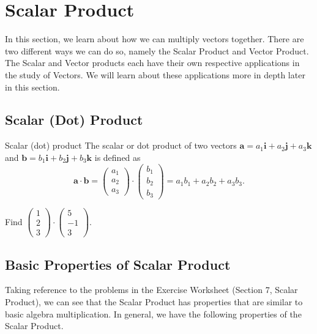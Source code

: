 \documentclass[a4paper]{book}
\newcommand{\cvv}[3]{\begin{pmatrix}#1\\#2\\#3\end{pmatrix}}
\begin{document}
\clearpage
\section{Scalar Product}
In this section, we learn about how we can multiply vectors together. There are two different ways we can do so, namely the Scalar Product and Vector Product. The Scalar and Vector products each have their own respective applications in the study of Vectors. We will learn about these applications more in depth later in this section.

\subsection{Scalar (Dot) Product}
\begin{definition}{Scalar (dot) product}
The scalar or dot product of two vectors $\mathbf a=a_1\mathbf i+a_2\mathbf j+a_3\mathbf k$ and $\mathbf b=b_1\mathbf i+b_2\mathbf j+b_3\mathbf k$ is defined as
\[
\mathbf a\cdot\mathbf b=\cvv{a_1}{a_2}{a_3}\cdot\cvv{b_1}{b_2}{b_3}=a_1b_1+a_2b_2+a_3b_3.
\]
\end{definition}

\begin{example}
Find $\cvv{1}{2}{3}\cdot\cvv{5}{-1}{3}$.
\end{example}
\solution{
\[
\begin{aligned}
\cvv{1}{2}{3}\cdot\cvv{5}{-1}{3}&=1(5)+2(-1)+3(3)\\
&=12
\end{aligned}
\]}


\subsection{Basic Properties of Scalar Product}
Taking reference to the problems in the Exercise Worksheet (Section 7, Scalar Product), we can see that the Scalar Product has properties that are similar to basic algebra multiplication. In general, we have the following properties of the Scalar Product.
\end{document}
